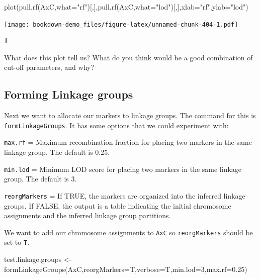 \documentclass[
]{book}
\makeatletter
\newenvironment{Shaded}{\begin{snugshade}}{\end{snugshade}}
\newcommand{\AttributeTok}[1]{\textcolor[rgb]{0.77,0.63,0.00}{#1}}
\newcommand{\DecValTok}[1]{\textcolor[rgb]{0.00,0.00,0.81}{#1}}
\newcommand{\FloatTok}[1]{\textcolor[rgb]{0.00,0.00,0.81}{#1}}
\newcommand{\FunctionTok}[1]{\textcolor[rgb]{0.00,0.00,0.00}{#1}}
\newcommand{\NormalTok}[1]{#1}
\newcommand{\OtherTok}[1]{\textcolor[rgb]{0.56,0.35,0.01}{#1}}
\newcommand{\StringTok}[1]{\textcolor[rgb]{0.31,0.60,0.02}{#1}}
\newenvironment{kframe}{%
\medskip{}
\setlength{\fboxsep}{.8em}
 \def\at@end@of@kframe{}%
 \ifinner\ifhmode%
  \def\at@end@of@kframe{\end{minipage}}%
  \begin{minipage}{\columnwidth}%
 \fi\fi%
 \def\FrameCommand##1{\hskip\@totalleftmargin \hskip-\fboxsep
 \colorbox{shadecolor}{##1}\hskip-\fboxsep
     \hskip-\linewidth \hskip-\@totalleftmargin \hskip\columnwidth}%
 \MakeFramed {\advance\hsize-\width
   \@totalleftmargin\z@ \linewidth\hsize
   \@setminipage}}%
 {\par\unskip\endMakeFramed%
 \at@end@of@kframe}
\newenvironment{rmdblock}[1]
  {
  \begin{itemize}
  \renewcommand{\labelitemi}{
    \raisebox{-.7\height}[0pt][0pt]{
      {\setkeys{Gin}{width=3em,keepaspectratio}\texttt{[image: images/\#1]}}
    }
  }
  \setlength{\fboxsep}{1em}
  \begin{kframe}
  \item
  }
  {
  \end{kframe}
  \end{itemize}
  }
\newenvironment{rmdquiz}
  {\begin{rmdblock}{quiz}}
  {\end{rmdblock}}
\makeatother
\begin{document}
\begin{Shaded}
\begin{Highlighting}[]
\FunctionTok{plot}\NormalTok{(}\FunctionTok{pull.rf}\NormalTok{(AxC,}\AttributeTok{what=}\StringTok{"rf"}\NormalTok{)[,],}\FunctionTok{pull.rf}\NormalTok{(AxC,}\AttributeTok{what=}\StringTok{"lod"}\NormalTok{)[,],}\AttributeTok{xlab=}\StringTok{"rf"}\NormalTok{,}\AttributeTok{ylab=}\StringTok{"lod"}\NormalTok{) }
\end{Highlighting}
\end{Shaded}

\texttt{[image: bookdown-demo\_files/figure-latex/unnamed-chunk-404-1.pdf]}

\begin{rmdquiz}
\textbf{1}

What does this plot tell us? What do you think would be a good combination of cut-off parameters, and why?
\end{rmdquiz}

\hypertarget{forming-linkage-groups}{%
\subsection{Forming Linkage groups}\label{forming-linkage-groups}}

Next we want to allocate our markers to linkage groups. The command for this is \texttt{formLinkageGroups}. It has some options that we could experiment with:

\texttt{max.rf} = Maximum recombination fraction for placing two markers in the same linkage group. The default is 0.25.

\texttt{min.lod} = Minimum LOD score for placing two markers in the same linkage group. The default is 3.

\texttt{reorgMarkers} = If TRUE, the markers are organized into the inferred linkage groups. If FALSE, the output is a table indicating the initial chromosome assignments and the inferred linkage group partitions.

We want to add our chromosome assignments to \texttt{AxC} so \texttt{reorgMarkers} should be set to \texttt{T}.

\begin{Shaded}
\begin{Highlighting}[]
\NormalTok{test.linkage.groups }\OtherTok{\textless{}{-}}
\FunctionTok{formLinkageGroups}\NormalTok{(AxC,}\AttributeTok{reorgMarkers=}\NormalTok{T,}\AttributeTok{verbose=}\NormalTok{T,}\AttributeTok{min.lod=}\DecValTok{3}\NormalTok{,}\AttributeTok{max.rf=}\FloatTok{0.25}\NormalTok{) }
\end{Highlighting}
\end{Shaded}
\end{document}
